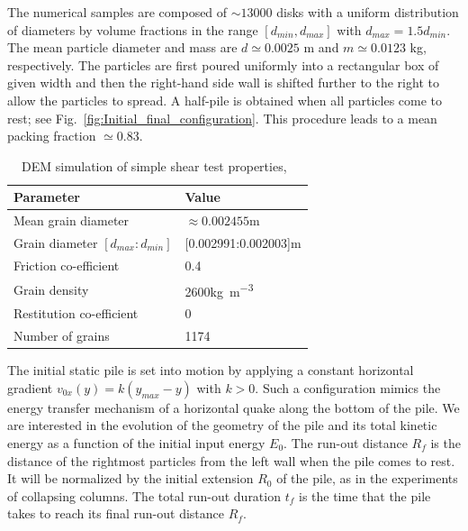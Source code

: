 The numerical samples are composed of $\sim13000$ disks with a uniform 
distribution of diameters by volume fractions in the range $[d_{min}, 
d_{max}]$ with $d_{max} = 1.5 d_{min}$. The mean particle diameter and 
mass are $d\simeq 0.0025 $ m and $m\simeq 0.0123$ kg, respectively. 
The particles are first poured uniformly into a rectangular box of given width 
and then the right-hand side wall is shifted further to the right to allow the 
particles to spread. A half-pile is obtained when all particles come to 
rest; see Fig.~\ref{fig:Initial_final_configuration}. This procedure leads to a 
mean packing fraction $\simeq 0.83$.



\begin{table}[tbhp]
\caption{DEM simulation of simple shear test properties,~\citep{Mutabaruka2013}}
\label{table:CD_Shear}
\centering
\begin{tabular}{ll}
\toprule
\textbf{Parameter} & \textbf{Value} \\ \midrule
Mean grain diameter & $\approx 0.002455$\si{\m} \\
Grain diameter $[d_{max}:d_{min}]$ & [0.002991:0.002003]\si{\m} \\
Friction co-efficient & 0.4\\
Grain density & 2600\si{\kg\per\meter\cubed} \\
Restitution co-efficient  & $0$\\
Number of grains & 1174 \\
\bottomrule
\end{tabular}
\end{table}


The initial static pile is set into motion by applying a constant horizontal
gradient  $v_{0x}(y) = k (y_{max} - y)$ with $k>0$. Such a configuration 
mimics the energy transfer mechanism of a horizontal quake along the bottom of 
the pile. We are interested in the evolution of the geometry of the pile 
and its total kinetic energy as a function of the initial input energy $E_0$. 
The run-out distance $R_f$ is the distance of the rightmost particles 
from the left wall when the pile comes to rest.  It will be normalized by the 
initial extension $R_0$ of the pile, as in the experiments of collapsing 
columns. The total run-out duration $t_f$ is the time that the pile takes to 
reach its final run-out distance $R_f$.

